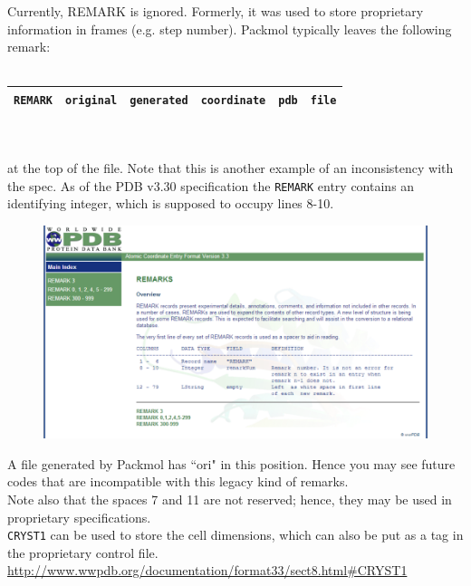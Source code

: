 Currently, REMARK is ignored. Formerly, it was used to store proprietary information in frames (e.g. step number). Packmol typically leaves the following remark:\\\\
\begin{tabularx}{\textwidth}{| X | X | X | X | X | X |}
\hline
  \texttt{REMARK} & \texttt{original} & \texttt{generated} & \texttt{coordinate} & \texttt{pdb} & \texttt{file}  \\
\hline
\end{tabularx}\\\\
at the top of the file. Note that this is another example of an inconsistency with the spec. As of the PDB v3.30 specification the \texttt{REMARK} entry contains an identifying integer, which is supposed to occupy lines 8-10.\\
\begin{figure}[H]
\centering
\includegraphics[scale=1.0]{images/remark}
\end{figure}
A file generated by Packmol has ``ori" in this position. Hence you may see future codes that are incompatible with this legacy kind of remarks.\\
Note also that the spaces 7 and 11 are not reserved; hence, they may be used in proprietary specifications.\\
\texttt{CRYST1} can be used to store the cell dimensions, which can also be put as a tag in the proprietary control file.\\
\url{http://www.wwpdb.org/documentation/format33/sect8.html#CRYST1}\\
